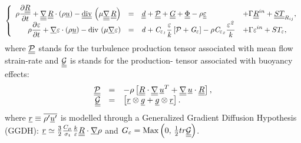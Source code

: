 \begin{equation}
\left\{
\begin{array}{rcll}
\displaystyle
 \rho \der{\tens{R}}{t}
+ \gradtt \, \tens{R} \cdot \left( \rho \vect{u} \right)
- \divt \left( \mu \gradtt \,\tens{R} \right)
& = &
\displaystyle
\tens{\mathit{d}} +
\tens{\mathcal{P}} + \tens{G}+ \tens{\Phi}
-\rho \tens{\varepsilon} & \displaystyle+\Gamma \tens{R}^{in}+\tens{ST}_{R_{ij}},
\\
\displaystyle
\rho \der{\varepsilon }{t}
+ \grad \varepsilon \cdot \left( \rho \vect{u} \right)
- \dive\left(\mu \grad{\varepsilon}\right)
& = & \displaystyle
\mathit{{d}+C_{\varepsilon _{1}}\frac{\varepsilon }{k}\left[ \mathcal{P}%
+G_{\varepsilon }\right] -\rho C_{\varepsilon _{2}}\frac{\varepsilon ^{2}}{k}}
& \displaystyle+\Gamma \varepsilon ^{in}+ST_{\varepsilon },
\end{array}%
\right.
\end{equation}
where
$\underline{\underline{\mathcal{P}}}$ stands for the turbulence production tensor associated
with mean flow strain-rate and $\underline{\underline{\mathcal{G}}}$ is stands for the
production- tensor associated with buoyancy effects:
\begin{equation}
\begin{array}{r c l}
\displaystyle \underline{\underline{ \mathcal{P}}} & = & \displaystyle-\rho \left[ \underline{\underline{R}} \cdot \underline{\underline{{\nabla}}} \, \underline{u}^T
+ \underline{\underline{{\nabla}}} \, \underline{u}  \cdot \underline{\underline{R}}\right], \\
\underline{\underline{ \mathcal{G}}} & = &
\displaystyle \left[\underline{r} \otimes \underline{g} +\underline{g} \otimes \underline{r}  \right].
\end{array}
\end{equation}
where $ \underline{r} \equiv \overline{\rho^\prime \underline{u}^\prime}$ is modelled through a Generalized Gradient Diffusion Hypothesis (GGDH):
\mbox{$\underline{r} \simeq \frac{3}{2}\frac{C_{\mu }}{\sigma_{t}} \frac{k}{\varepsilon } \underline{\underline{R}} \cdot \underline{\nabla}  \rho$} and
$G_{\varepsilon }= \text{Max} \left(0, \, \frac{1}{2}tr \underline{\underline{\mathcal{G}}}\right)$.

